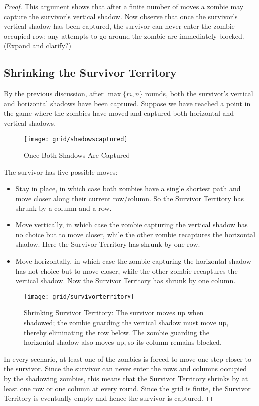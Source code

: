 \begin{proof}
This argument shows that after a finite number of moves a zombie may capture the
survivor's vertical shadow. Now observe that once the survivor's
vertical shadow has been captured, the survivor can never enter the zombie-occupied
row: any attempts to go around the zombie are immediately blocked. (Expand and clarify?)

\subsection{Shrinking the Survivor Territory}

By the previous discussion, after $\max \{ m, n \}$ rounds, both the survivor's vertical
and horizontal shadows have been captured. Suppose we have reached a point in the
game where the zombies have moved and captured both horizontal and vertical shadows.

\begin{figure}
  \centering
  \texttt{[image: grid/shadowscaptured]}
  \caption{Once Both Shadows Are Captured\label{fig:shadowscaptured}}
\end{figure}

The survivor has five possible moves:

\begin{itemize}
  \item Stay in place, in which case both zombies have a single shortest path and
  move closer along their current row/column. So the Survivor Territory has shrunk by a column and a row.
  \item Move vertically, in which case the zombie capturing the vertical shadow
  has no choice but to move closer, while the other zombie recaptures the horizontal shadow.
  Here the Survivor Territory has shrunk by one row.
  \item Move horizontally, in which case the zombie capturing the horizontal shadow
  has not choice but to move closer, while the other zombie recaptures the vertical shadow.
  Now the Survivor Territory has shrunk by one column.
\end{itemize}

\begin{figure}[h]
  \centering
  \texttt{[image: grid/survivorterritory]}
  \caption{Shrinking Survivor Territory: The survivor moves up when shadowed; the zombie
  guarding the vertical shadow must move up, thereby eliminating the row below. The
  zombie guarding the horizontal shadow also moves up, so its column remains blocked.\label{fig:survivorterritory}}
\end{figure}

In every scenario, at least one of the zombies is forced to move one
step closer to the survivor. Since the survivor can never enter the rows and columns
occupied by the shadowing zombies, this means that the Survivor Territory
 shrinks by at least one row or one column at every round.
Since the grid is finite, the Survivor Territory is eventually empty and hence
the survivor is captured.

\end{proof}

